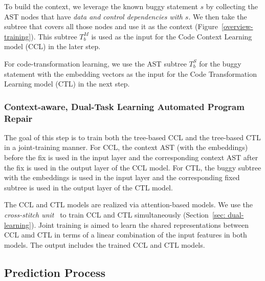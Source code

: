 To build the context, we leverage the known buggy statement $s$ by
collecting the AST nodes that have {\em data and control dependencies
  with $s$}. We then take the subtree that covers all
those nodes and use it as the context
(Figure~\ref{overview-training}). This subtree $T_b^{M}$ is used as
the input for the Code Context Learning model (CCL) in the later step.

For code-transformation learning, we use the AST subtree $T_b^{S}$ for
the buggy statement with the embedding vectors as the input for the
Code Transformation Learning model (CTL) in the next step.


\subsubsection{Context-aware, Dual-Task Learning Automated Program
  Repair}

The goal of this step is to train both the tree-based CCL and the
tree-based CTL in a joint-training manner. For CCL, the context AST
(with the embeddings) before the fix is used in the input layer and
the corresponding context AST after the fix is used in the output
layer of the CCL model. For CTL, the buggy subtree with the embeddings
is used in the input layer and the corresponding fixed subtree is used
in the output layer of the CTL model.

The CCL and CTL models are realized via attention-based 
models. We use the {\em cross-stitch unit}~\cite{misra2016cross} to
train CCL and CTL simultaneously (Section~\ref{sec: dual-learning}).
Joint training is aimed to learn the shared representations between
CCL amd CTL in terms of a linear combination of the input features in
both models.  The output includes the trained CCL and CTL models.

\subsection{Prediction Process}

